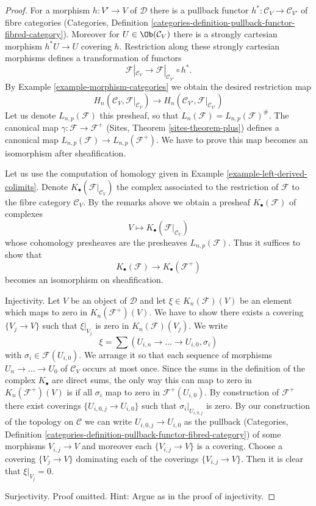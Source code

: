 \begin{proof}
For a morphism $h : V' \to V$ of $\mathcal{D}$ there is a
pullback functor $h^* : \mathcal{C}_V \to \mathcal{C}_{V'}$ of fibre
categories (Categories, Definition
\ref{categories-definition-pullback-functor-fibred-category}).
Moreover for $U \in \Ob(\mathcal{C}_V)$ there is a
strongly cartesian morphism $h^*U \to U$ covering $h$.
Restriction along these strongly cartesian morphisms defines a
transformation of functors
$$
\mathcal{F}|_{\mathcal{C}_V}
\longrightarrow
\mathcal{F}|_{\mathcal{C}_{V'}} \circ h^*.
$$
By Example \ref{example-morphism-categories}
we obtain the desired restriction map
$$
H_n(\mathcal{C}_V, \mathcal{F}|_{\mathcal{C}_V})
\longrightarrow
H_n(\mathcal{C}_{V'}, \mathcal{F}|_{\mathcal{C}_{V'}})
$$
Let us denote $L_{n, p}(\mathcal{F})$ this presheaf, so that
$L_n(\mathcal{F}) = L_{n, p}(\mathcal{F})^\#$.
The canonical map $\gamma : \mathcal{F} \to \mathcal{F}^+$
(Sites, Theorem \ref{sites-theorem-plus})
defines a canonical
map $L_{n, p}(\mathcal{F}) \to L_{n, p}(\mathcal{F}^+)$.
We have to prove this map becomes an isomorphism after sheafification.

\medskip\noindent
Let us use the computation of homology given in
Example \ref{example-left-derived-colimits}. Denote
$K_\bullet(\mathcal{F}|_{\mathcal{C}_V})$ the complex associated to
the restriction of $\mathcal{F}$ to the fibre category $\mathcal{C}_V$.
By the remarks above we obtain a presheaf $K_\bullet(\mathcal{F})$
of complexes
$$
V \longmapsto K_\bullet(\mathcal{F}|_{\mathcal{C}_V})
$$
whose cohomology presheaves are the presheaves $L_{n, p}(\mathcal{F})$.
Thus it suffices to show that
$$
K_\bullet(\mathcal{F}) \longrightarrow K_\bullet(\mathcal{F}^+)
$$
becomes an isomorphism on sheafification.

\medskip\noindent
Injectivity. Let $V$ be an object of $\mathcal{D}$ and let
$\xi \in K_n(\mathcal{F})(V)$ be an element which maps
to zero in $K_n(\mathcal{F}^+)(V)$. We have to show there exists a
covering $\{V_j \to V\}$ such that $\xi|_{V_j}$ is zero in
$K_n(\mathcal{F})(V_j)$. We write
$$
\xi = \sum (U_{i, n} \to \ldots \to U_{i, 0}, \sigma_i)
$$
with $\sigma_i \in \mathcal{F}(U_{i, 0})$. We arrange it so that
each sequence of morphisms $U_n \to \ldots \to U_0$ of $\mathcal{C}_V$
occurs at most once. Since the sums in the definition
of the complex $K_\bullet$ are direct sums, the only way this can map
to zero in $K_n(\mathcal{F}^+)(V)$ is if all $\sigma_i$ map
to zero in $\mathcal{F}^+(U_{i, 0})$. By construction of
$\mathcal{F}^+$ there exist coverings $\{U_{i, 0, j} \to U_{i, 0}\}$
such that $\sigma_i|_{U_{i, 0, j}}$ is zero. By our construction of
the topology on $\mathcal{C}$ we can write $U_{i, 0, j} \to U_{i, 0}$
as the pullback (Categories, Definition
\ref{categories-definition-pullback-functor-fibred-category})
of some morphisms $V_{i, j} \to V$ and moreover each
$\{V_{i, j} \to V\}$ is a covering. Choose a covering
$\{V_j \to V\}$ dominating each of the coverings $\{V_{i, j} \to V\}$.
Then it is clear that $\xi|_{V_j} = 0$.

\medskip\noindent
Surjectivity. Proof omitted. Hint: Argue as in the proof of
injectivity.
\end{proof}

